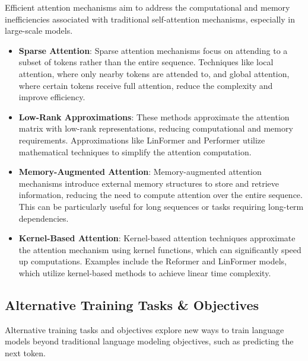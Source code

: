 Efficient attention mechanisms aim to address the computational and memory inefficiencies associated with traditional self-attention mechanisms, especially in large-scale models.

\begin{itemize}
    \item \textbf{Sparse Attention}: Sparse attention mechanisms focus on attending to a subset of tokens rather than the entire sequence. Techniques like local attention, where only nearby tokens are attended to, and global attention, where certain tokens receive full attention, reduce the complexity and improve efficiency.

    \item \textbf{Low-Rank Approximations}: These methods approximate the attention matrix with low-rank representations, reducing computational and memory requirements. Approximations like LinFormer and Performer utilize mathematical techniques to simplify the attention computation.

    \item \textbf{Memory-Augmented Attention}: Memory-augmented attention mechanisms introduce external memory structures to store and retrieve information, reducing the need to compute attention over the entire sequence. This can be particularly useful for long sequences or tasks requiring long-term dependencies.

    \item \textbf{Kernel-Based Attention}: Kernel-based attention techniques approximate the attention mechanism using kernel functions, which can significantly speed up computations. Examples include the Reformer and LinFormer models, which utilize kernel-based methods to achieve linear time complexity.

\end{itemize}

\subsection{Alternative Training Tasks \& Objectives}

Alternative training tasks and objectives explore new ways to train language models beyond traditional language modeling objectives, such as predicting the next token.


